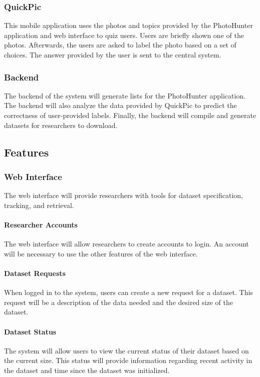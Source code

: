 \documentclass{article}
\begin{document}
\subsubsection{QuickPic}
This mobile application uses the photos and topics provided by the PhotoHunter
application and web interface to quiz users. Users are briefly shown one of the
photos. Afterwards, the users are asked to label the photo based on a set of
choices. The answer provided by the user is sent to the central system.

\subsubsection{Backend}
The backend of the system will generate lists for the PhotoHunter application.
The backend will also analyze the data provided by QuickPic to predict the
correctness of user-provided labels. Finally, the backend will compile and
generate datasets for researchers to download.

\subsection{Features}

\subsubsection{Web Interface}
The web interface will provide researchers with tools for dataset
specification, tracking, and retrieval.

  \paragraph{Researcher Accounts}
  The web interface will allow researchers to create accounts to login. An
  account will be necessary to use the other features of the web interface.

  \paragraph{Dataset Requests}
  When logged in to the system, users can create a new request for a dataset.
  This request will be a description of the data needed and the desired size of
  the dataset.

  \paragraph{Dataset Status}
  The system will allow users to view the current status of their dataset based
  on the current size. This status will provide information regarding recent
  activity in the dataset and time since the dataset was initialized.
\end{document}
